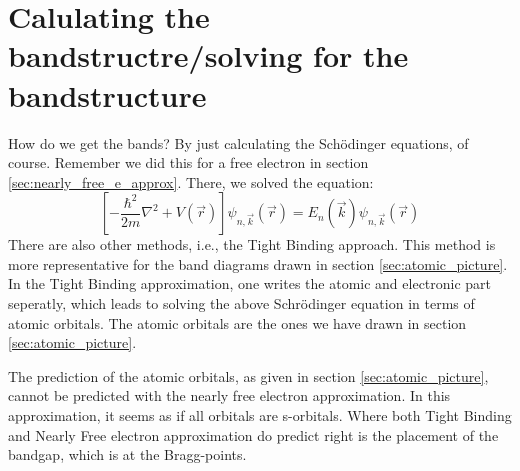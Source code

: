 \section{Calulating the bandstructre/solving for the bandstructure}
How do we get the bands? By just calculating the Schödinger equations, of course. Remember we did this for a free electron in section \ref{sec:nearly_free_e_approx}. There, we solved the equation:
\begin{equation}
	\left[-\frac{\hbar^2}{2m}\nabla^2 + V(\vec{r})\right]\psi_{n, \vec{k}}(\vec{r}) = E_n(\vec{k})\psi_{n, \vec{k}}(\vec{r})
\end{equation}
There are also other methods, i.e., the Tight Binding approach. This method is more representative for the band diagrams drawn in section \ref{sec:atomic_picture}. In the Tight Binding approximation, one writes the atomic and electronic part seperatly, which leads to solving the above Schrödinger equation in terms of atomic orbitals. The atomic orbitals are the ones we have drawn in section \ref{sec:atomic_picture}.\par
The prediction of the atomic orbitals, as given in section \ref{sec:atomic_picture}, cannot be predicted with the nearly free electron approximation. In this approximation, it seems as if all orbitals are s-orbitals. Where both Tight Binding and Nearly Free electron approximation do predict right is the placement of the bandgap, which is at the Bragg-points.
